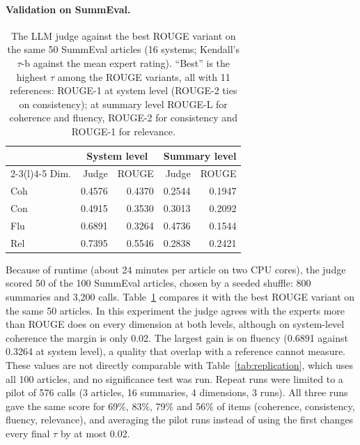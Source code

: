 \documentclass[11pt]{article}
\begin{document}
\paragraph{Validation on SummEval.}
\begin{table}[t]
\centering
\small
\begin{tabular}{@{}lrrrr@{}}
\toprule
& \multicolumn{2}{c}{System level} & \multicolumn{2}{c}{Summary level} \\
\cmidrule(lr){2-3}\cmidrule(l){4-5}
Dim. & Judge & ROUGE & Judge & ROUGE \\
\midrule
Coh & 0.4576 & 0.4370 & 0.2544 & 0.1947 \\
Con & 0.4915 & 0.3530 & 0.3013 & 0.2092 \\
Flu & 0.6891 & 0.3264 & 0.4736 & 0.1544 \\
Rel & 0.7395 & 0.5546 & 0.2838 & 0.2421 \\
\bottomrule
\end{tabular}
\caption{The LLM judge against the best ROUGE variant on the same 50 SummEval articles (16 systems; Kendall's $\tau$-b against the mean expert rating). ``Best'' is the highest $\tau$ among the ROUGE variants, all with 11 references: ROUGE-1 at system level (ROUGE-2 ties on consistency); at summary level ROUGE-L for coherence and fluency, ROUGE-2 for consistency and ROUGE-1 for relevance.}
\label{tab:judge}
\end{table}
Because of runtime (about 24 minutes per article on two CPU cores), the judge scored 50 of the 100 SummEval articles, chosen by a seeded shuffle: 800 summaries and 3,200 calls. Table~\ref{tab:judge} compares it with the best ROUGE variant on the same 50 articles. In this experiment the judge agrees with the experts more than ROUGE does on every dimension at both levels, although on system-level coherence the margin is only 0.02. The largest gain is on fluency (0.6891 against 0.3264 at system level), a quality that overlap with a reference cannot measure. These values are not directly comparable with Table~\ref{tab:replication}, which uses all 100 articles, and no significance test was run. Repeat runs were limited to a pilot of 576 calls (3 articles, 16 summaries, 4 dimensions, 3 runs). All three runs gave the same score for 69\%, 83\%, 79\% and 56\% of items (coherence, consistency, fluency, relevance), and averaging the pilot runs instead of using the first changes every final $\tau$ by at most 0.02.
\end{document}
